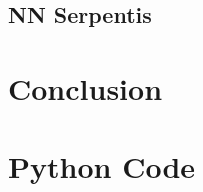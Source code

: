 \documentclass[%
reprint,
amsmath,amssymb,
aps,
]{revtex4-2}
\begin{document}
		
		\subsection{NN Serpentis}

	\section{Conclusion}
		
		
		
	\newpage
	\appendix
		
	\section{Python Code}
		
		
		
\end{document}
